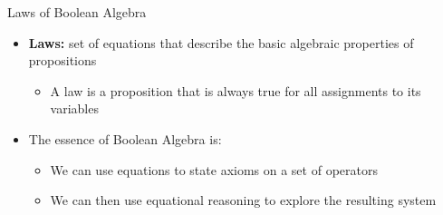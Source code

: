 \documentclass[11pt,t,pdf,xcolor=svgnames,aspectratio=169]{beamer}
\providecommand{\tightlist}{%
  \setlength{\itemsep}{5pt}\setlength{\parskip}{0pt}}
\begin{document}
\begin{frame}{Laws of Boolean Algebra}
\protect\hypertarget{laws-of-boolean-algebra}{}
\begin{itemize}
\tightlist
\item
  \textbf{Laws:} set of equations that describe the basic algebraic
  properties of propositions

  \begin{itemize}
  \tightlist
  \item
    A law is a proposition that is always true for all assignments to
    its variables
  \end{itemize}
\item
  The essence of Boolean Algebra is:

  \begin{itemize}
  \tightlist
  \item
    We can use equations to state axioms on a set of operators
  \item
    We can then use equational reasoning to explore the resulting system
  \end{itemize}
\end{itemize}
\end{frame}
\end{document}

